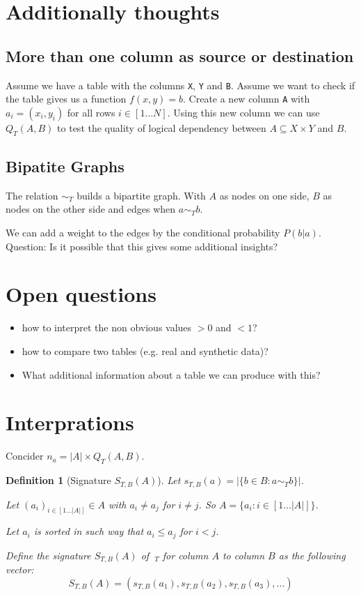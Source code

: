 \documentclass[a4paper]{article}
\newtheorem{definition}{Definition}
\begin{document}
\section{Additionally thoughts}
\subsection{More than one column as source or destination}
Assume we have a table with the columns \texttt{X}, \texttt{Y} and \texttt{B}.
Assume we want to check if the table gives us a function $f(x,y) = b$.
  Create a new column \texttt{A} with $a_i = (x_i, y_i)$ for all rows $i \in [1 \ldots N]$. 
  Using this new column we can use $Q_T(A,B)$ to test the quality of logical dependency between $A \subseteq X \times Y$ and $B$. 

\subsection{Bipatite Graphs}
The relation $\sim_T$ builds a bipartite graph.
With $A$ as nodes on one side, $B$ as nodes on the other side and edges when $a \sim_T b$.

We can add a weight to the edges by the conditional probability $P(b|a)$.
Question: Is it possible that this gives some additional insights?


\section{Open questions}
\begin{itemize}
\item how to interpret the non obvious values $> 0$ and $< 1$?
\item how to compare two tables (e.g. real and synthetic data)?
\item What additional information about a table we can produce with this?
\end{itemize}



\section{Interprations}
Concider $n_a = |A| \times Q_T(A,B)$. 

\begin{definition}[Signature $S_{T,B}(A)$]
  Let $s_{T,B}(a) = |\{ b \in B : a \sim_T b \}|$.

  Let $(a_i)_{i \in [1 \ldots |A|]} \in A$ with $a_i \neq a_j$ for $i \neq j$.
  So $A = \{ a_i : i \in [1 \ldots |A|] \}$.

  Let $a_i$ is sorted in such way that $a_i \leq a_j$ for $i < j$.

  Define the signature $S_{T,B}(A)$ of $~_T$ for column $A$ to column $B$ as the following vector:
  \begin{equation}
    S_{T,B}(A) = (s_{T,B}(a_1), s_{T,B}(a_2), s_{T,B}(a_3), \ldots )
  \end{equation}
\end{definition}
\end{document}
